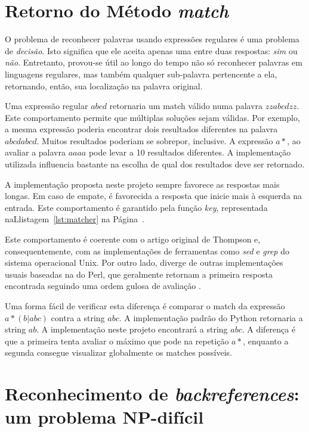 \documentclass[a4paper,12pt,oneside,onecolumn]{uerj}
\begin{document}
\section{Retorno do Método \emph{match}}

O problema de reconhecer palavras usando expressões regulares é uma problema de \emph{decisão}. Isto significa que ele aceita apenas uma entre duas respostas: \emph{sim} ou \emph{não}. Entretanto, provou-se útil ao longo do tempo não só reconhecer palavras em linguagens regulares, mas também qualquer sub-palavra pertencente a ela, retornando, então, sua localização na palavra original.

Uma expressão regular $abcd$ retornaria um match válido numa palavra $zzabcdzz$. Este comportamento permite que múltiplas soluções sejam válidas. Por exemplo, a mesma expressão poderia encontrar dois resultados diferentes na palavra $abcdabcd$. Muitos resultados poderiam se sobrepor, inclusive. A expressão $a*$, ao avaliar a palavra $aaaa$ pode levar a 10 resultados diferentes. A implementação utilizada influencia bastante na escolha de qual dos resultados deve ser retornado.

A implementação proposta neste projeto sempre favorece as respostas mais longas. Em caso de empate, é favorecida a resposta que inicie mais à esquerda na entrada. Este comportamento é garantido pela função \emph{key}, representada naLlistagem~\ref{lst:matcher} na Página~\pageref{lst:matcher}.

Este comportamento é coerente com o artigo original de Thompson e, consequentemente, com as implementações de ferramentas como \emph{sed} e \emph{grep} do sistema operacional Unix. Por outro lado, diverge de outras implementações usuais baseadas na do Perl, que geralmente retornam a primeira resposta encontrada seguindo uma ordem gulosa de avaliação \cite{bib:Cox07}.

Uma forma fácil de verificar esta diferença é comparar o match da expressão \linebreak
$a*(b|abc)$ contra a string $abc$. A implementação padrão do Python retornaria a string $ab$. A implementação neste projeto encontrará a string $abc$. A diferença é que a primeira tenta avaliar o máximo que pode na repetição $a*$, enquanto a segunda consegue visualizar globalmente os matches possíveis.

\section{Reconhecimento de \emph{backreferences}: um problema NP-difícil}
\end{document}
